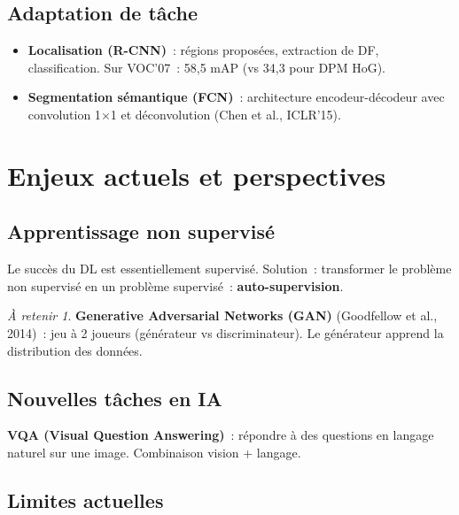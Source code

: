 \documentclass[a4paper,11pt]{article}
\theoremstyle{definition}
\theoremstyle{remark}
\newtheorem*{important}{\`A retenir}
\begin{document}
\subsection{Adaptation de t\^ache}

\begin{itemize}
  \item \textbf{Localisation (R-CNN)}~: r\'egions propos\'ees,
    extraction de DF, classification. Sur VOC'07~: 58{,}5 mAP
    (vs 34{,}3 pour DPM HoG).
  \item \textbf{Segmentation s\'emantique (FCN)}~: architecture
    encodeur-d\'ecodeur avec convolution 1$\times$1 et
    d\'econvolution (Chen et al., ICLR'15).
\end{itemize}

\section{Enjeux actuels et perspectives}

\subsection{Apprentissage non supervis\'e}

Le succ\`es du DL est essentiellement supervis\'e. Solution~:
transformer le probl\`eme non supervis\'e en un probl\`eme
supervis\'e~: \textbf{auto-supervision}.

\begin{important}
  \textbf{Generative Adversarial Networks (GAN)} (Goodfellow et al.,
  2014)~: jeu \`a 2 joueurs (g\'en\'erateur vs discriminateur).
  Le g\'en\'erateur apprend la distribution des donn\'ees.
\end{important}

\subsection{Nouvelles t\^aches en IA}

\textbf{VQA (Visual Question Answering)}~: r\'epondre \`a des
questions en langage naturel sur une image. Combinaison vision
+ langage.

\subsection{Limites actuelles}
\end{document}
